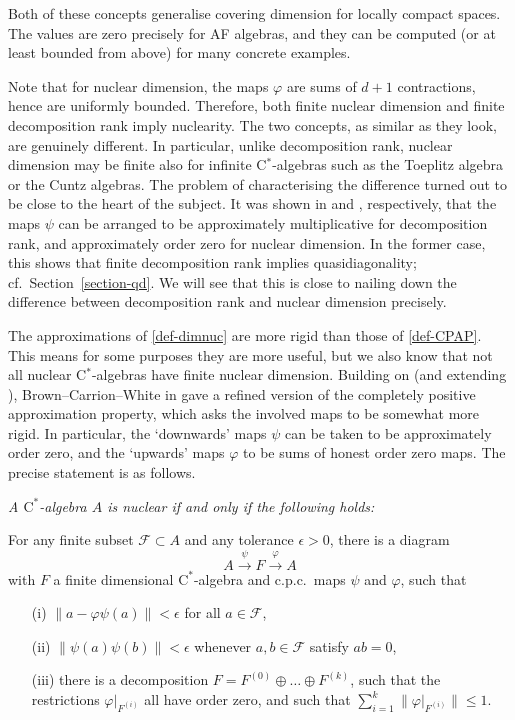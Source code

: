\documentclass{amsart}
\newcounter{number}[section]
\newenvironment{nummer}{\refstepcounter{number}{\noindent\arabic{section}.\arabic{number}}}{}
\newcommand{\bn}{\noindent \begin{nummer} \rm}
\newcommand{\en}{\end{nummer}}
\newenvironment{ntheorem}{\noindent {\sc Theorem:} \it}{}
\begin{document}
Both of these concepts generalise covering dimension for locally compact spaces. The values are zero precisely for AF algebras, and they can be computed (or at least bounded from above) for many concrete examples. 

Note that for nuclear dimension, the maps $\varphi$ are sums of $d+1$ contractions, hence are uniformly bounded. Therefore, both finite nuclear dimension and finite decomposition rank imply nuclearity. The two concepts, as similar as they look, are genuinely different. In particular, unlike decomposition rank, nuclear dimension may be finite also for infinite C$^*$-algebras such as the Toeplitz algebra or the Cuntz algebras. The problem of characterising the difference turned out to be close to the heart of the subject. It was shown in \cite{KirWin:dr} and \cite{WinZac:dimnuc}, respectively, that the maps $\psi$ can be arranged to be approximately multiplicative for decomposition rank, and approximately order zero for nuclear dimension. In the former case, this shows that finite decomposition rank implies quasidiagonality; cf.\ Section~{\ref{section-qd}}. We will see that this is close to nailing down the difference between decomposition rank and nuclear dimension precisely.
\en


\bn
\label{convex-approximations}
The approximations of \ref{def-dimnuc} are more rigid than those of \ref{def-CPAP}. This means for some purposes they are more useful, but we also know that not all nuclear C$^*$-algebras have finite nuclear dimension. Building on \cite{HKW:Advances} (and extending \cite{CE:CPAP}), Brown--Carrion--White in \cite{BCW:Abel} gave a refined version of the completely positive approximation property, which asks the involved maps to be somewhat more rigid. In particular, the `downwards' maps $\psi$ can be taken to be approximately order zero, and the `upwards' maps $\varphi$ to be sums of honest order zero maps. The precise statement is as follows.

\begin{ntheorem}
A $\mathrm{C}^*$-algebra $A$ is nuclear if and only if the following holds: 

For any finite subset $\mathcal{F} \subset A$ and any tolerance $\epsilon>0$, there is a diagram
\[
A \stackrel{\psi}{\longrightarrow} F \stackrel{\varphi}{\longrightarrow} A
\]
with $F$ a finite dimensional $\mathrm{C}^*$-algebra and c.p.c.\  maps $\psi$ and $\varphi$, such that 
\begin{itemize}
\item[(i)] $\|a - \varphi\psi(a)\| < \epsilon$ for all $a \in \mathcal{F}$,
\item[(ii)] $\|\psi(a) \psi(b)\| < \epsilon$ whenever $a,b \in \mathcal{F}$ satisfy $ab = 0$,
\item[(iii)] there is a decomposition $F = F^{(0)} \oplus \ldots \oplus F^{(k)}$, such that the restrictions $\varphi|_{F^{(i)}}$ all have order zero, and such that $\sum_{i=1}^k \|\varphi|_{F^{(i)}}\| \le 1$.   
\end{itemize}
\end{ntheorem}
\end{document}
